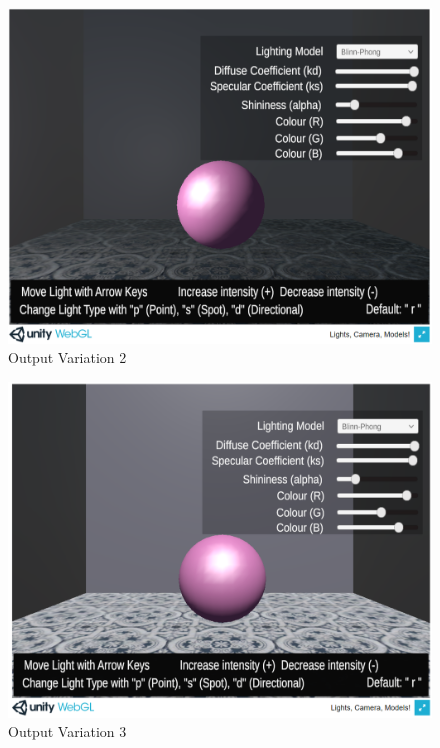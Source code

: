 \documentclass[12pt, titlepage]{article}
\begin{document}
\begin{enumerate}
	\begin{figure}[h]
		\centering
		\includegraphics[scale=0.25]{./images/sphere-lit-point-moveValid}
		\caption{Output Variation 2}
		\label{fig:point-move}
	\end{figure}	
	
	\begin{figure}[h]
		\centering
		\includegraphics[scale=0.25]{./images/sphere-lit-direction}
		\caption{Output Variation 3}
		\label{fig:directional-move}
	\end{figure}


\end{enumerate}
\end{document}
